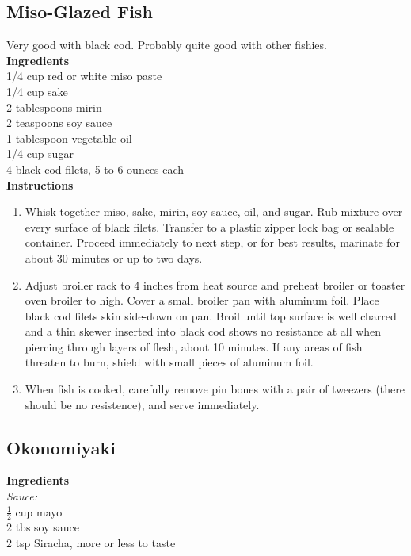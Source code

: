 \documentclass{article}
\numberwithin{figure}{section}
\numberwithin{equation}{section}
\begin{document}
\pagebreak
\subsection{Miso-Glazed Fish}
Very good with black cod. Probably quite good with other fishies.\\

{\bf Ingredients}\\
1/4 cup red or white miso paste\\
1/4 cup sake\\
2 tablespoons mirin\\
2 teaspoons soy sauce\\
1 tablespoon vegetable oil\\
1/4 cup sugar\\
4 black cod filets, 5 to 6 ounces each\\

{\bf Instructions}
\begin{enumerate}
\item Whisk together miso, sake, mirin, soy sauce, oil, and sugar. Rub mixture over every surface of black filets. Transfer to a plastic zipper lock bag or sealable container. Proceed immediately to next step, or for best results, marinate for about 30 minutes or up to two days.
\item Adjust broiler rack to 4 inches from heat source and preheat broiler or toaster oven broiler to high. Cover a small broiler pan with aluminum foil. Place black cod filets skin side-down on pan. Broil until top surface is well charred and a thin skewer inserted into black cod shows no resistance at all when piercing through layers of flesh, about 10 minutes. If any areas of fish threaten to burn, shield with small pieces of aluminum foil.
\item When fish is cooked, carefully remove pin bones with a pair of tweezers (there should be no resistence), and serve immediately.
\end{enumerate}

\pagebreak
\subsection{Okonomiyaki}
{\bf Ingredients}\\
{\it Sauce:}\\
$\frac{1}{2}$ cup mayo\\
2 tbs soy sauce \\
2 tsp Siracha, more or less to taste\\
\end{document}
